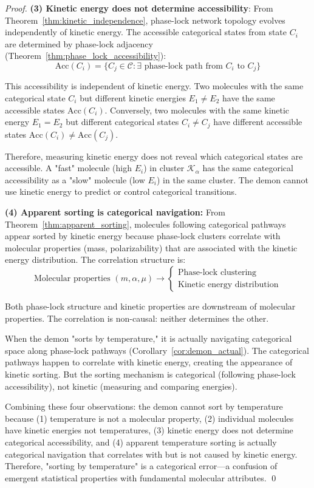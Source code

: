\documentclass[12pt,a4paper]{article}
\theoremstyle{definition}
\theoremstyle{remark}
\newcommand{\catspace}{\mathcal{C}}
\newcommand{\accessible}{\text{Acc}}
\begin{document}
\begin{proof}
\textbf{(3) Kinetic energy does not determine accessibility}:
From Theorem~\ref{thm:kinetic_independence}, phase-lock network topology evolves independently of kinetic energy. The accessible categorical states from state $C_i$ are determined by phase-lock adjacency (Theorem~\ref{thm:phase_lock_accessibility}):
\begin{equation}
\accessible(C_i) = \{C_j \in \catspace : \exists \text{ phase-lock path from } C_i \text{ to } C_j\}
\end{equation}

This accessibility is independent of kinetic energy. Two molecules with the same categorical state $C_i$ but different kinetic energies $E_1 \neq E_2$ have the same accessible states $\accessible(C_i)$. Conversely, two molecules with the same kinetic energy $E_1 = E_2$ but different categorical states $C_i \neq C_j$ have different accessible states $\accessible(C_i) \neq \accessible(C_j)$.

Therefore, measuring kinetic energy does not reveal which categorical states are accessible. A "fast" molecule (high $E_i$) in cluster $\mathcal{K}_\alpha$ has the same categorical accessibility as a "slow" molecule (low $E_i$) in the same cluster. The demon cannot use kinetic energy to predict or control categorical transitions.

\textbf{(4) Apparent sorting is categorical navigation:}
From Theorem~\ref{thm:apparent_sorting}, molecules following categorical pathways appear sorted by kinetic energy because phase-lock clusters correlate with molecular properties (mass, polarizability) that are associated with the kinetic energy distribution. The correlation structure is:
\begin{equation}
\text{Molecular properties } (m, \alpha, \mu) \to \begin{cases} \text{Phase-lock clustering} \\ \text{Kinetic energy distribution} \end{cases}
\end{equation}

Both phase-lock structure and kinetic properties are downstream of molecular properties. The correlation is non-causal: neither determines the other.

When the demon "sorts by temperature," it is actually navigating categorical space along phase-lock pathways (Corollary~\ref{cor:demon_actual}). The categorical pathways happen to correlate with kinetic energy, creating the appearance of kinetic sorting. But the sorting mechanism is categorical (following phase-lock accessibility), not kinetic (measuring and comparing energies).

Combining these four observations: the demon cannot sort by temperature because (1) temperature is not a molecular property, (2) individual molecules have kinetic energies not temperatures, (3) kinetic energy does not determine categorical accessibility, and (4) apparent temperature sorting is actually categorical navigation that correlates with but is not caused by kinetic energy. Therefore, "sorting by temperature" is a categorical error—a confusion of emergent statistical properties with fundamental molecular attributes. \qed
\end{proof}
\end{document}
